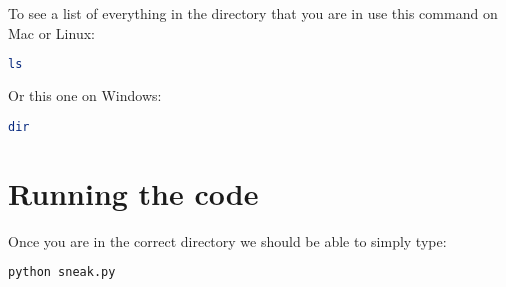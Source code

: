 \documentclass{article}
\begin{document}
To see a list of everything in the directory that you are in use this command on Mac or Linux:
\begin{center}
\begin{lstlisting}[language=bash]
ls
\end{lstlisting}
\end{center}

Or this one on Windows:
\begin{center}
\begin{lstlisting}[language=bash]
dir
\end{lstlisting}
\end{center}


\section{Running the code}
Once you are in the correct directory we should be able to simply type:
\begin{lstlisting}[language=bash]
python sneak.py
\end{lstlisting}
\end{document}
